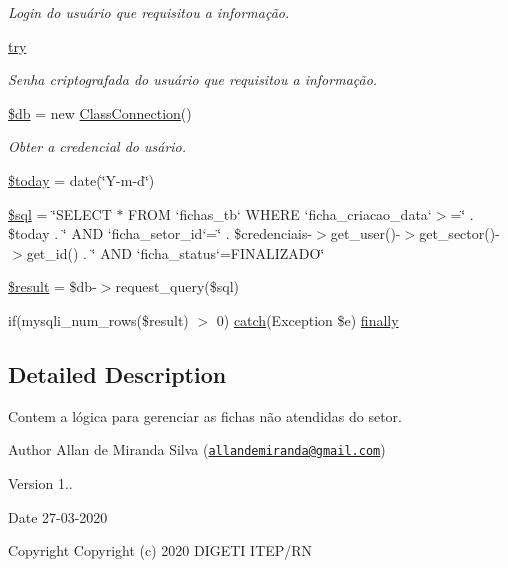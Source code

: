 \begin{DoxyCompactItemize}
\begin{DoxyCompactList}\small\item\em Login do usuário que requisitou a informação. \end{DoxyCompactList}\item 
\hyperlink{atendidos_8php_abe4cc9788f52e49485473dc699537388}{try}
\begin{DoxyCompactList}\small\item\em Senha criptografada do usuário que requisitou a informação. \end{DoxyCompactList}\item 
\hyperlink{atendidos_8php_a1fa3127fc82f96b1436d871ef02be319}{\$db} = new \hyperlink{class_class_connection}{Class\+Connection}()
\begin{DoxyCompactList}\small\item\em Obter a credencial do usário. \end{DoxyCompactList}\item 
\hyperlink{atendidos_8php_af1b7fb9d06cdc6d22c14741fc3cc185a}{\$today} = date(\char`\"{}Y-\/m-\/d\char`\"{})
\item 
\hyperlink{atendidos_8php_a047170d6020a882807665812a27e2525}{\$sql} = \char`\"{}S\+E\+L\+E\+CT $\ast$ F\+R\+OM `fichas\+\_\+tb` W\+H\+E\+RE `ficha\+\_\+criacao\+\_\+data`$>$=\textquotesingle{}\char`\"{} . \$today . \char`\"{}\textquotesingle{} A\+ND `ficha\+\_\+setor\+\_\+id`=\char`\"{} . \$credenciais-\/$>$get\+\_\+user()-\/$>$get\+\_\+sector()-\/$>$get\+\_\+id() . \char`\"{} A\+ND `ficha\+\_\+status`=\textquotesingle{}F\+I\+N\+A\+L\+I\+Z\+A\+DO\textquotesingle{}\char`\"{}
\item 
\hyperlink{atendidos_8php_a112ef069ddc0454086e3d1e6d8d55d07}{\$result} = \$db-\/$>$request\+\_\+query(\$sql)
\item 
if(mysqli\+\_\+num\+\_\+rows(\$result) $>$ 0) \hyperlink{imprimir_2ficha_2index_8php_a8104793004944f01dd070fc8b1ade3c4}{catch}(Exception \$e) \hyperlink{atendidos_8php_af7cfe1f8cb9dba05c425311a444e3fb4}{finally}
\end{DoxyCompactItemize}


\subsection{Detailed Description}
Contem a lógica para gerenciar as fichas não atendidas do setor. 

\begin{DoxyAuthor}{Author}
Allan de Miranda Silva (\href{mailto:allandemiranda@gmail.com}{\tt allandemiranda@gmail.\+com}) 
\end{DoxyAuthor}
\begin{DoxyVersion}{Version}
1.. 
\end{DoxyVersion}
\begin{DoxyDate}{Date}
27-\/03-\/2020
\end{DoxyDate}
\begin{DoxyCopyright}{Copyright}
Copyright (c) 2020 D\+I\+G\+E\+TI I\+T\+E\+P/\+RN 
\end{DoxyCopyright}


